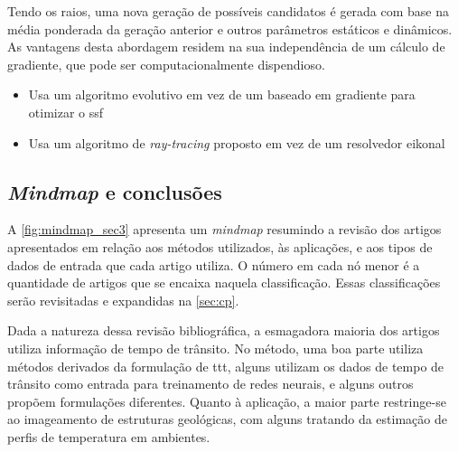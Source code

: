 Tendo os raios, uma nova geração de possíveis candidatos é gerada com base na média ponderada da geração anterior e outros parâmetros estáticos e dinâmicos. As vantagens desta abordagem residem na sua independência de um cálculo de gradiente, que pode ser computacionalmente dispendioso.

\begin{itemize}
	\item Usa um algoritmo evolutivo em vez de um baseado em gradiente para otimizar o \gls{ssf}
	\item Usa um algoritmo de \textsl{ray-tracing} proposto em vez de um resolvedor eikonal
\end{itemize}

\subsection{\textsl{Mindmap} e conclusões}

A \cref{fig:mindmap_sec3} apresenta um \textsl{mindmap} resumindo a revisão dos artigos apresentados em relação aos métodos utilizados, às aplicações, e aos tipos de dados de entrada que cada artigo utiliza. O número em cada nó menor é a quantidade de artigos que se encaixa naquela classificação. Essas classificações serão revisitadas e expandidas na \cref{sec:cp}.

Dada a natureza dessa revisão bibliográfica, a esmagadora maioria dos artigos utiliza informação de tempo de trânsito. No método, uma boa parte utiliza métodos derivados da formulação de \gls{ttt}, alguns utilizam os dados de tempo de trânsito como entrada para treinamento de redes neurais, e alguns outros propõem formulações diferentes. Quanto à aplicação, a maior parte restringe-se ao imageamento de estruturas geológicas, com alguns tratando da estimação de perfis de temperatura em ambientes.
